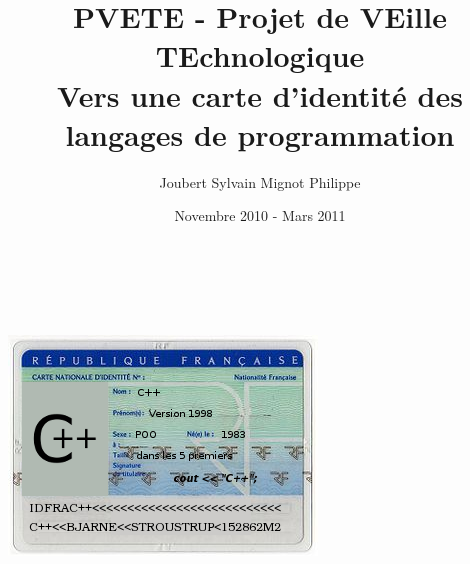 \documentclass[a4paper, 11pt]{article}
\title{PVETE - Projet de VEille TEchnologique \\
Vers une carte d'identité des langages de programmation}
\author{{\sc Joubert} Sylvain \hspace{1cm} {\sc Mignot} Philippe}
\date{Novembre 2010 - Mars 2011}
\begin{document}

\begin{titlepage}
\begin{center}
\LARGE \thetitle \normalsize \\
\bigskip \bigskip \bigskip
\large \theauthor \\
\bigskip \bigskip
\thedate \normalsize
\end{center}

\vspace*{\fill}

\begin{center}
\includegraphics[scale=1.2]{img/carte.png}
\end{center}

\vspace*{\fill}

\end{titlepage}

\tableofcontents
\newpage








\end{document}
